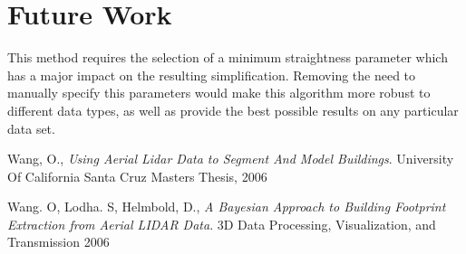 \documentclass{InsightArticle}
\begin{document}
\section{Future Work}
This method requires the selection of a minimum straightness parameter which has a major impact on the resulting simplification. Removing the need to manually specify this parameters would make this algorithm more robust to different data types, as well as provide the best possible results on any particular data set.

\begin{thebibliography}{9}

	  Wang, O.,
	  \emph{Using Aerial Lidar Data to Segment And Model Buildings}.
	  University Of California Santa Cruz Masters Thesis, 2006


	  Wang. O, Lodha. S, Helmbold, D.,
	  \emph{A Bayesian Approach to Building Footprint Extraction from Aerial LIDAR Data}.
	  3D Data Processing, Visualization, and Transmission 2006

\end{thebibliography}
\end{document}
